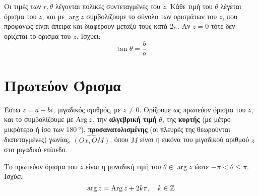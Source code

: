 Οι τιμές των $r, \theta$ λέγονται \textcolor{Col1}{πολικές συντεταγμένες} του $z$. Κάθε
τιμή του $\theta$ λέγεται \textcolor{Col1}{όρισμα} του $z$, και με $\arg z$ 
συμβολίζουμε το σύνολο των ορισμάτων του $z$, που προφανώς είναι άπειρα και διαφέρουν 
μεταξύ τους κατά $2\pi$. Αν $z=0$ τότε δεν ορίζεται το όρισμα του $z$. Ισχύει:
\[
  \tan\theta=\frac{b}{a}
\]


\section*{Πρωτεύον Όρισμα}


\begin{mybox1}
  \begin{dfn}
    Έστω $ z=a+bi $, μιγαδικός αριθμός, με $ z \neq 0 $. 
    Ορίζουμε ως \textcolor{Col1}{πρωτεύον όρισμα} του $ z 
    $, και το συμβολίζουμε με $ \operatorname{Arg} z $, την \textbf{αλγεβρική τιμή} $\theta$, 
    της \textbf{κυρτής} (με μέτρο μικρότερο ή ίσο των $ \SI{180}{\degree} $), 
    \textbf{προσανατολισμένης} (οι πλευρές της θεωρούνται διατεταγμένες) γωνίας, 
    $ \widehat{(Ox,OM)} $, όπου $M$ είναι η εικόνα του 
    μιγαδικού αριθμού $z$ στο μιγαδικό επίπεδο.
  \end{dfn}
\end{mybox1}
\begin{rem}
  Το πρωτεύον όρισμα του $z$ είναι η μοναδική τιμή του 
  $\theta\in \arg z$ ώστε $ - \pi < \theta \leq \pi$. 
  Ισχύει:
  \[
    \arg z=\operatorname{Arg} z+2k\pi, \quad k\in\mathbb{Z}
  \]
\end{rem}

